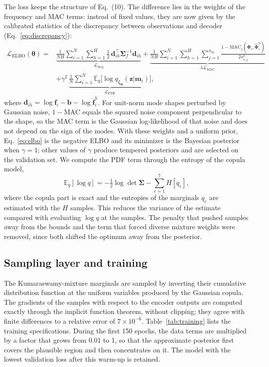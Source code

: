 \documentclass[11pt]{article}
\newcommand{\m}{\mathbf{m}}
\newcommand{\z}{\mathbf{z}}
\newcommand{\f}{\mathbf{f}}
\newcommand{\Lelbo}{\mathcal{L}_{\mathrm{ELBO}}}
\begin{document}
The loss keeps the structure of Eq.~(10). The difference lies in the weights of the frequency and MAC terms: instead of
fixed values, they are now given by the calibrated statistics of the discrepancy between observations and decoder
(Eq.~\ref{eq:discrepancy}):
\begin{equation}
\begin{split}
\Lelbo(\bm\theta) = {} & \underbrace{\frac{1}{N H}\sum_{i=1}^{N}\sum_{h=1}^{H}
\tfrac12\,\mathbf{d}_{ih}^{\top}\bm\Sigma_f^{-1}\mathbf{d}_{ih}}_{\mathcal{L}_{\mathrm{freq}}}
+\underbrace{\frac{1}{N H}\sum_{i=1}^{N}\sum_{h=1}^{H}\sum_{j=1}^{n_m}
\frac{1-\mathrm{MAC}_j(\bm\Phi_i,\hat{\bm\Phi}_i^h)}{2s_{v,j}^2}}_{\lambda\mathcal{L}_{\mathrm{MAC}}} \\
& +\gamma^2\,\underbrace{\frac1N\sum_{i=1}^N \mathbb{E}_q\big[\log q_{\bm\zeta_{\bm\theta}}(\z|\m_i)\big]}_{\mathcal{L}_{\mathrm{PDF}}},
\end{split}
\label{eq:elbo}
\end{equation}
where $\mathbf{d}_{ih}=\log\f_i-\mathbf{b}-\log\hat{\f}_i^h$. For unit-norm mode shapes perturbed by Gaussian noise,
$1-\mathrm{MAC}$ equals the squared noise component perpendicular to the shape, so the MAC term is the Gaussian
log-likelihood of that noise and does not depend on the sign of the modes. With these weights and a uniform prior,
Eq.~\eqref{eq:elbo} is the negative ELBO and its minimizer is the Bayesian posterior when $\gamma=1$; other values of
$\gamma$ produce tempered posteriors and are selected on the validation set. We compute the PDF term through the
entropy of the copula model,
\begin{equation}
\mathbb{E}_q[\log q] = -\tfrac12\log\det\bm\Sigma - \sum_{e=1}^{7} H[q_e],
\label{eq:entropy}
\end{equation}
where the copula part is exact and the entropies of the marginals $q_e$ are estimated with the $H$ samples. This
reduces the variance of the estimate compared with evaluating $\log q$ at the samples. The penalty that pushed samples
away from the bounds and the term that forced diverse mixture weights were removed, since both shifted the optimum
away from the posterior.

\subsection{Sampling layer and training}

The Kumaraswamy-mixture marginals are sampled by inverting their cumulative distribution function at the uniform
variables produced by the Gaussian copula. The gradients of the samples with respect to the encoder outputs are
computed exactly through the implicit function theorem, without clipping; they agree with finite differences to a
relative error of $7\times10^{-6}$. Table~\ref{tab:training} lists the training specifications. During the first 150
epochs, the data terms are multiplied by a factor that grows from 0.01 to 1, so that the approximate posterior first
covers the plausible region and then concentrates on it. The model with the lowest validation loss after this warm-up
is retained.
\end{document}
